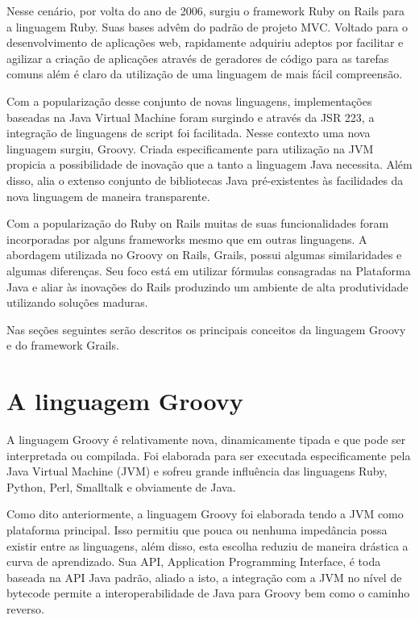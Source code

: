 \documentclass[12pt]{article}
\begin{document}
    Nesse cenário, por volta do ano de 2006, surgiu o framework Ruby on Rails para a linguagem Ruby. Suas bases advêm do padrão de
    projeto MVC. Voltado para o desenvolvimento de aplicações web, rapidamente adquiriu adeptos por facilitar e agilizar a criação 
    de aplicações através de geradores de código para as tarefas comuns além é claro da utilização de uma linguagem de mais fácil
    compreensão.

    Com a popularização desse conjunto de novas linguagens, implementações baseadas na Java Virtual Machine foram surgindo e através 
    da JSR 223, a integração de linguagens de script foi facilitada. Nesse contexto uma nova linguagem surgiu, Groovy. Criada 
    especificamente para utilização na JVM propicia a possibilidade de inovação que a tanto a linguagem Java necessita. Além 
    disso, alia o extenso conjunto de bibliotecas Java pré-existentes às facilidades da nova linguagem de maneira transparente. 
    
    Com a popularização do Ruby on Rails muitas de suas funcionalidades foram incorporadas por alguns frameworks mesmo que em
    outras linguagens. A abordagem utilizada no Groovy on Rails, Grails, possui algumas similaridades e algumas diferenças. 
    Seu foco está em utilizar fórmulas consagradas na Plataforma Java e aliar às inovações do Rails produzindo um ambiente 
    de alta produtividade utilizando soluções maduras.
    
    Nas seções seguintes serão descritos os principais conceitos da linguagem Groovy e do framework Grails.

\section{A linguagem Groovy} \label{sec:firstpage}

    A linguagem Groovy é relativamente nova, dinamicamente tipada e que pode ser interpretada ou compilada. Foi elaborada para ser executada 
    especificamente pela Java Virtual Machine (JVM) e sofreu grande influência das linguagens Ruby, Python, Perl, Smalltalk e obviamente de Java.
    
    Como dito anteriormente, a linguagem Groovy foi elaborada tendo a JVM como plataforma principal. Isso permitiu que pouca ou nenhuma impedância
    possa existir entre as linguagens, além disso, esta escolha reduziu de maneira drástica a curva de aprendizado. Sua API, Application Programming 
    Interface, é toda baseada na API Java padrão, aliado a isto, a integração com a JVM no nível de bytecode permite a interoperabilidade de Java para
    Groovy bem como o caminho reverso.
    
\end{document}
